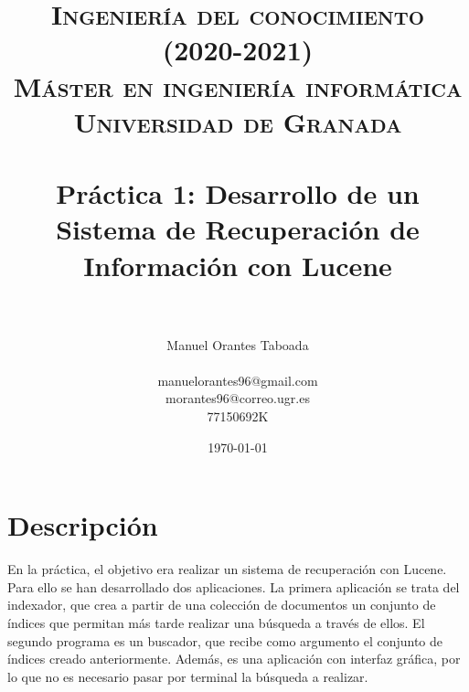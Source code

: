 
\usepackage{booktabs}
\usepackage{tabularx}
\usepackage{multicol} 
\usepackage{hyperref}


\title{
\normalfont \normalsize 
\textsc{\textbf{Ingeniería del conocimiento (2020-2021)} \\ Máster en ingeniería informática \\ Universidad de Granada} \\ [25pt] %
\horrule{0.5pt} \\[0.4cm] %
\huge Práctica 1: Desarrollo de un Sistema de
Recuperación de Información con Lucene \\ %
\horrule{2pt} \\[0.5cm] %
}
\author{Manuel Orantes Taboada \\ \\ manuelorantes96@gmail.com \\ morantes96@correo.ugr.es \\ 77150692K} %

\date{\normalsize\today} %




\maketitle %

\newpage %

\tableofcontents %

\newpage

\section{Descripción}

En la práctica, el objetivo era realizar un sistema de recuperación con Lucene. Para ello se han desarrollado dos aplicaciones. La primera aplicación se trata del indexador, que crea a partir de una colección de documentos un conjunto de índices que permitan más tarde realizar una búsqueda a través de ellos. El segundo programa es un buscador, que recibe como argumento el conjunto de índices creado anteriormente. Además, es una aplicación con interfaz gráfica, por lo que no es necesario pasar por terminal la búsqueda a realizar.\\

